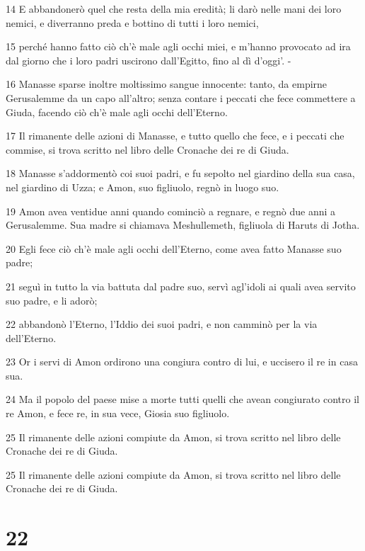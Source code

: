 \par 14 E abbandonerò quel che resta della mia eredità; li darò nelle mani dei loro nemici, e diverranno preda e bottino di tutti i loro nemici,
\par 15 perché hanno fatto ciò ch'è male agli occhi miei, e m'hanno provocato ad ira dal giorno che i loro padri uscirono dall'Egitto, fino al dì d'oggi'. -
\par 16 Manasse sparse inoltre moltissimo sangue innocente: tanto, da empirne Gerusalemme da un capo all'altro; senza contare i peccati che fece commettere a Giuda, facendo ciò ch'è male agli occhi dell'Eterno.
\par 17 Il rimanente delle azioni di Manasse, e tutto quello che fece, e i peccati che commise, si trova scritto nel libro delle Cronache dei re di Giuda.
\par 18 Manasse s'addormentò coi suoi padri, e fu sepolto nel giardino della sua casa, nel giardino di Uzza; e Amon, suo figliuolo, regnò in luogo suo.
\par 19 Amon avea ventidue anni quando cominciò a regnare, e regnò due anni a Gerusalemme. Sua madre si chiamava Meshullemeth, figliuola di Haruts di Jotha.
\par 20 Egli fece ciò ch'è male agli occhi dell'Eterno, come avea fatto Manasse suo padre;
\par 21 seguì in tutto la via battuta dal padre suo, servì agl'idoli ai quali avea servito suo padre, e li adorò;
\par 22 abbandonò l'Eterno, l'Iddio dei suoi padri, e non camminò per la via dell'Eterno.
\par 23 Or i servi di Amon ordirono una congiura contro di lui, e uccisero il re in casa sua.
\par 24 Ma il popolo del paese mise a morte tutti quelli che avean congiurato contro il re Amon, e fece re, in sua vece, Giosia suo figliuolo.
\par 25 Il rimanente delle azioni compiute da Amon, si trova scritto nel libro delle Cronache dei re di Giuda.
\par 25 Il rimanente delle azioni compiute da Amon, si trova scritto nel libro delle Cronache dei re di Giuda.

\chapter{22}

